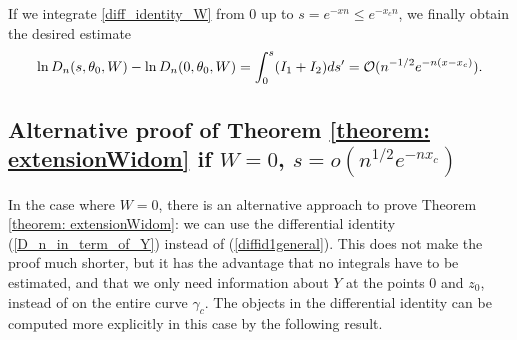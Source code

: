 \documentclass[11pt,fleqn]{article}
\numberwithin{equation}{section}
\def\bigO{{\cal O}}
\begin{document}
If we integrate \eqref{diff_identity_W} from $0$ up to $s=e^{-xn} \leq e^{-x_{c}n}$, we finally obtain the desired estimate
\begin{equation*}
\ln D_{n} (s,\theta_{0},W) - \ln D_{n}(0,\theta_{0},W) = \int_{0}^{s} (I_{1} + I_{2}) ds^{\prime} =\bigO(n^{-1/2}e^{-n(x-x_c)}).
\end{equation*}







\subsection{Alternative proof of Theorem \ref{theorem: extensionWidom} if $W=0$, $s=o(n^{1/2}e^{-nx_c})$}\label{section: proof W0}
In the case where $W=0$, there is an alternative approach to prove Theorem \ref{theorem: extensionWidom}: we can use the differential identity (\ref{D_n_in_term_of_Y}) instead of (\ref{diffid1general}). This does not make the proof much shorter, but it has the advantage that no integrals have to be estimated, and that we only need information about $Y$ at the points $0$ and $z_0$, instead of on the entire curve $\gamma_c$. The objects in the differential identity can be computed more explicitly in this case by the following result.
\end{document}
